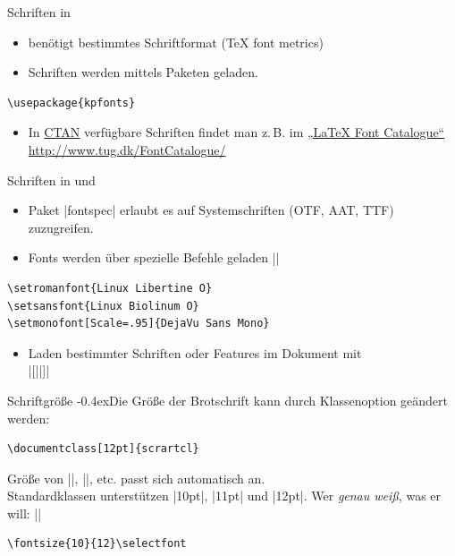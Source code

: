 \documentclass[
	vorläufig=true,
	datum=2016-10-28,
	titel={Allgemeine Formatierung und Pakete},
	web=false,
]{../tex/latexkurs-slides}
\begin{document}
\begin{frame}[fragile,t]{Schriften in }
\begin{itemize}
\item {} benötigt bestimmtes Schriftformat (\TeX{} font metrics)
\item Schriften werden mittels Paketen geladen.
\end{itemize}
\begin{lstlisting}
\usepackage{kpfonts}
\end{lstlisting}
\begin{itemize}
\item In \href{http://www.ctan.org}{CTAN} verfügbare Schriften findet man z.\,B. im \href{http://www.tug.dk/FontCatalogue/}{„LaTeX Font Catalogue“}\\\url{http://www.tug.dk/FontCatalogue/}
\end{itemize}
\end{frame}

\begin{frame}[fragile,t]{Schriften in \XeLaTeX und }
\begin{itemize}
\item Paket |fontspec| erlaubt es auf Systemschriften (OTF, AAT, TTF) zuzugreifen.
\item Fonts werden über spezielle Befehle geladen ||
\end{itemize}
\begin{lstlisting}
\setromanfont{Linux Libertine O}
\setsansfont{Linux Biolinum O}
\setmonofont[Scale=.95]{DejaVu Sans Mono}
\end{lstlisting}
\begin{olcol}
\begin{itemize}
\item Laden bestimmter Schriften oder Features im Dokument mit\\|[||]|
\end{itemize}
\end{olcol}
\end{frame}

\begin{frame}[fragile]{Schriftgröße}%
\kern-0.4exDie Größe der Brotschrift kann durch Klassenoption geändert werden:
\begin{lstlisting}
\documentclass[12pt]{scrartcl}
\end{lstlisting}
Größe von |\large|, |\small|, etc. passt sich automatisch an.\\
Standardklassen unterstützen |10pt|, |11pt| und |12pt|.
\vfill
\pause
Wer \emph{genau weiß}, was er will: |\selectfont|
\begin{lstlisting}
\fontsize{10}{12}\selectfont
\end{lstlisting}
\end{frame}
\end{document}
